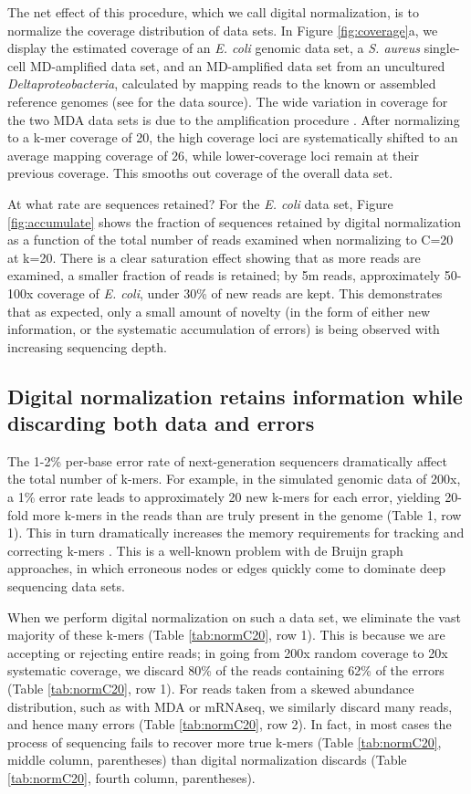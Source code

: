 The net effect of this procedure, which we call digital normalization,
is to normalize the coverage distribution of data sets.  In Figure
\ref{fig:coverage}a, we display the estimated coverage of an {\em
  E. coli} genomic data set, a {\em S. aureus} single-cell
MD-amplified data set, and an MD-amplified data set from an uncultured
{\em Deltaproteobacteria}, calculated by mapping reads to the known or
assembled reference genomes (see \cite{pubmed21926975} for the data
source).  The wide variation in coverage for the two MDA data sets is
due to the amplification procedure \cite{pubmed17487184}.  After
normalizing to a k-mer coverage of 20, the high coverage loci are
systematically shifted to an average mapping coverage of 26, while
lower-coverage loci remain at their previous coverage.  This smooths
out coverage of the overall data set.

At what rate are sequences retained?  For the {\em E. coli} data set,
Figure \ref{fig:accumulate} shows the fraction of sequences retained
by digital normalization as a function of the total number of reads
examined when normalizing to C=20 at k=20.  There is a clear
saturation effect showing that as more reads are examined, a smaller
fraction of reads is retained; by 5m reads, approximately 50-100x
coverage of {\em E. coli}, under 30\% of new reads are kept.  This
demonstrates that as expected, only a small amount of novelty (in
the form of either new information, or the systematic accumulation of
errors) is being observed with increasing sequencing depth.

\subsection{Digital normalization retains information while discarding
both data and errors}

The 1-2\% per-base error rate of next-generation sequencers
dramatically affect the total number of k-mers.  For example, in the
simulated genomic data of 200x, a 1\% error rate leads to
approximately 20 new k-mers for each error, yielding 20-fold more
k-mers in the reads than are truly present in the genome (Table 1, row
1).  This in turn dramatically increases the memory requirements for
tracking and correcting k-mers \cite{pubmed21245053}.  This is a
well-known problem with de Bruijn graph approaches, in which erroneous
nodes or edges quickly come to dominate deep sequencing data sets.

When we perform digital normalization on such a data set, we eliminate
the vast majority of these k-mers (Table \ref{tab:normC20}, row 1).
This is because we are accepting or rejecting entire reads; in
going from 200x random coverage to 20x systematic coverage, we
discard 80\% of the reads containing 62\% of the errors (Table
\ref{tab:normC20}, row 1).  For reads taken from a skewed abundance
distribution, such as with MDA or mRNAseq, we similarly discard many
reads, and hence many errors (Table \ref{tab:normC20}, row 2).  In
fact, in most cases the process of sequencing fails to recover
more true k-mers (Table \ref{tab:normC20}, middle column, parentheses) than
digital
normalization discards (Table \ref{tab:normC20}, fourth column, parentheses).

